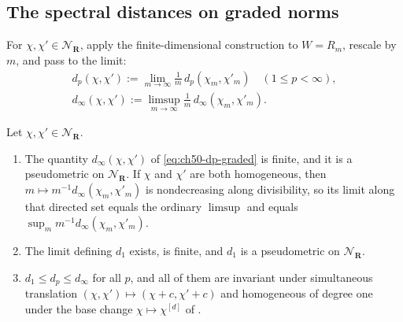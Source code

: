 \subsection{The spectral distances on graded norms}
\label{sec:ch50-dp-graded}

For $\chi,\chi'\in\mathcal N_{\mathbf R}$, apply the finite-dimensional
construction to $W=R_m$, rescale by $m$, and pass to the limit:
\[
 \begin{gathered}
 d_p(\chi,\chi'):=\lim_{m\to\infty}\frac1m\,d_p(\chi_m,\chi'_m)
 \quad(1\le p<\infty),\\
 d_\infty(\chi,\chi'):=\limsup_{m\to\infty}
      \frac1m\,d_\infty(\chi_m,\chi'_m).
 \end{gathered}
\tag{50.15}\label{eq:ch50-dp-graded}
\]

\begin{proposition}
\label{prop:ch50-dp-graded}
Let $\chi,\chi'\in\mathcal N_{\mathbf R}$.
\begin{enumerate}
\item\label{itm:ch50-dpg:infty}
      The quantity $d_\infty(\chi,\chi')$ of
      \eqref{eq:ch50-dp-graded} is finite, and it is a pseudometric on
      $\mathcal N_{\mathbf R}$.  If $\chi$ and $\chi'$ are
      both homogeneous, then $m\mapsto m^{-1}d_\infty(\chi_m,\chi'_m)$
      is nondecreasing along divisibility, so its limit along that directed set
      equals the ordinary $\limsup$ and equals $\sup_m m^{-1}d_\infty(\chi_m,\chi'_m)$.
\item\label{itm:ch50-dpg:one}
      The limit defining $d_1$ exists, is finite, and $d_1$ is a
      pseudometric on $\mathcal N_{\mathbf R}$.
\item\label{itm:ch50-dpg:interp}
      $d_1\le d_p\le d_\infty$ for all $p$, and all of them are
      invariant under simultaneous translation
      $(\chi,\chi')\mapsto(\chi+c,\chi'+c)$ and homogeneous of degree
      one under the base change $\chi\mapsto\chi^{[d]}$ of
      .
\end{enumerate}
\end{proposition}

